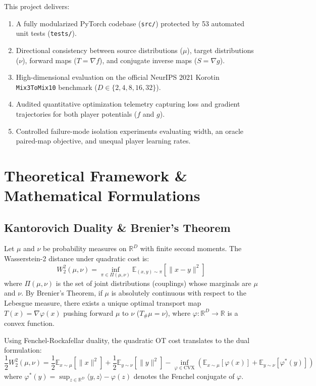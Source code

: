 \documentclass[11pt,a4paper]{article}
\begin{document}
This project delivers:
\begin{enumerate}
    \item A fully modularized PyTorch codebase (\texttt{src/}) protected by 53 automated unit tests (\texttt{tests/}).
    \item Directional consistency between source distributions ($\mu$), target distributions ($\nu$), forward maps ($T = \nabla f$), and conjugate inverse maps ($S = \nabla g$).
    \item High-dimensional evaluation on the official NeurIPS 2021 Korotin \texttt{Mix3ToMix10} benchmark ($D \in \{2, 4, 8, 16, 32\}$).
    \item Audited quantitative optimization telemetry capturing loss and gradient trajectories for both player potentials ($f$ and $g$).
    \item Controlled failure-mode isolation experiments evaluating width, an oracle paired-map objective, and unequal player learning rates.
\end{enumerate}

\section{Theoretical Framework \& Mathematical Formulations}

\subsection{Kantorovich Duality \& Brenier's Theorem}
Let $\mu$ and $\nu$ be probability measures on $\mathbb{R}^D$ with finite second moments. The Wasserstein-2 distance under quadratic cost is:
\begin{equation}
W_2^2(\mu, \nu) = \inf_{\pi \in \Pi(\mu, \nu)} \mathbb{E}_{(x, y) \sim \pi} \left[ \|x - y\|^2 \right]
\end{equation}
where $\Pi(\mu, \nu)$ is the set of joint distributions (couplings) whose marginals are $\mu$ and $\nu$. By Brenier's Theorem, if $\mu$ is absolutely continuous with respect to the Lebesgue measure, there exists a unique optimal transport map $T(x) = \nabla \varphi(x)$ pushing forward $\mu$ to $\nu$ ($T_\# \mu = \nu$), where $\varphi: \mathbb{R}^D \to \mathbb{R}$ is a convex function.

Using Fenchel-Rockafellar duality, the quadratic OT cost translates to the dual formulation:
\begin{equation}
\frac{1}{2} W_2^2(\mu, \nu) = \frac{1}{2} \mathbb{E}_{x \sim \mu}[\|x\|^2] + \frac{1}{2} \mathbb{E}_{y \sim \nu}[\|y\|^2] - \inf_{\varphi \in \text{CVX}} \left( \mathbb{E}_{x \sim \mu}[\varphi(x)] + \mathbb{E}_{y \sim \nu}[\varphi^*(y)] \right)
\end{equation}
where $\varphi^*(y) = \sup_{z \in \mathbb{R}^D} \langle y, z \rangle - \varphi(z)$ denotes the Fenchel conjugate of $\varphi$.
\end{document}
